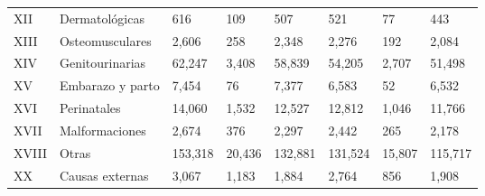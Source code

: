 \begin{tabular}{ll @{\hskip 0.5in}lll@{\hskip 0.5in} lll}
XII                    & Dermatológicas   & 616          & 109                & 507                & 521               & 77                      & 443     \\
XIII                   & Osteomusculares  & 2,606        & 258                & 2,348              & 2,276             & 192                     & 2,084   \\
XIV                    & Genitourinarias  & 62,247       & 3,408              & 58,839             & 54,205            & 2,707                   & 51,498  \\
XV                     & Embarazo y parto & 7,454        & 76                 & 7,377              & 6,583             & 52                      & 6,532   \\
XVI                    & Perinatales      & 14,060       & 1,532              & 12,527             & 12,812            & 1,046                   & 11,766  \\
XVII                   & Malformaciones   & 2,674        & 376                & 2,297              & 2,442             & 265                     & 2,178   \\
XVIII                  & Otras            & 153,318      & 20,436             & 132,881            & 131,524           & 15,807                  & 115,717 \\
XX                     & Causas externas  & 3,067        & 1,183              & 1,884              & 2,764             & 856                     & 1,908  \\  \bottomrule            
\end{tabular}
